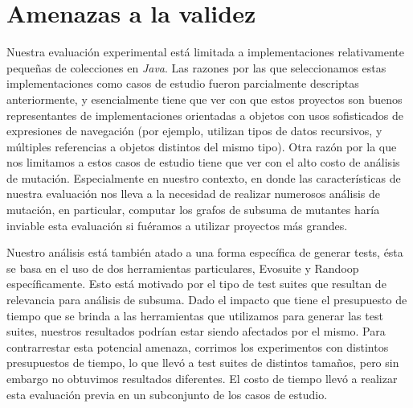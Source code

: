 \section{Amenazas a la validez}

Nuestra evaluaci\'on experimental est\'a limitada a implementaciones relativamente peque\~nas de colecciones en \emph{Java}. Las razones por las que seleccionamos estas implementaciones como casos de estudio fueron parcialmente descriptas anteriormente, y esencialmente tiene que ver con que estos proyectos son buenos representantes de implementaciones orientadas a objetos con usos sofisticados de expresiones de navegaci\'on (por ejemplo, utilizan tipos de datos recursivos, y m\'ultiples referencias a objetos distintos del mismo tipo). Otra raz\'on por la que nos limitamos a estos casos de estudio tiene que ver con el alto costo de an\'alisis de mutaci\'on. Especialmente en nuestro contexto, en donde las caracter\'isticas de nuestra evaluaci\'on nos lleva a la necesidad de realizar numerosos an\'alisis de mutaci\'on, en particular, computar los grafos de subsuma de mutantes har\'ia inviable esta evaluaci\'on si fu\'eramos a utilizar proyectos m\'as grandes.

Nuestro an\'alisis est\'a tambi\'en atado a una forma espec\'ifica de generar tests, \'esta se basa en el uso de dos herramientas particulares, Evosuite y Randoop espec\'ificamente. Esto est\'a motivado por el tipo de test suites que resultan de relevancia para an\'alisis de subsuma. Dado el impacto que tiene el presupuesto de tiempo que se brinda a las herramientas que utilizamos para generar las test suites, nuestros resultados podr\'ian estar siendo afectados por el mismo. Para contrarrestar esta potencial amenaza, corrimos los experimentos con distintos presupuestos de tiempo, lo que llev\'o a test suites de distintos tama\~nos, pero sin embargo no obtuvimos resultados diferentes. El costo de tiempo llev\'o a realizar esta evaluaci\'on previa en un subconjunto de los casos de estudio.

